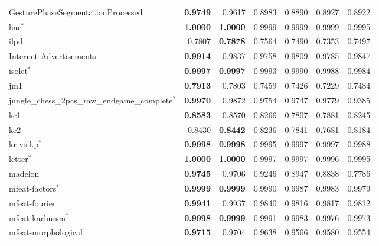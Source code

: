{\begin{longtable}{>{\raggedright\arraybackslash}p{3.3cm}rrrrrr}
Gesture\allowbreak Phase\allowbreak Segmentation\allowbreak Processed & \textbf{\num{0.9749}} & \num{0.9617} & \num{0.8983} & \num{0.8890} & \num{0.8927} & \num{0.8922} \\
har$^{*}$ & \textbf{\num{1.0000}} & \textbf{\num{1.0000}} & \num{0.9999} & \num{0.9999} & \num{0.9999} & \num{0.9995} \\
ilpd & \num{0.7807} & \textbf{\num{0.7878}} & \num{0.7564} & \num{0.7490} & \num{0.7353} & \num{0.7497} \\
Internet-Advertisements & \textbf{\num{0.9914}} & \num{0.9837} & \num{0.9758} & \num{0.9809} & \num{0.9785} & \num{0.9847} \\
isolet$^{*}$ & \textbf{\num{0.9997}} & \textbf{\num{0.9997}} & \num{0.9993} & \num{0.9990} & \num{0.9988} & \num{0.9984} \\
jm1 & \textbf{\num{0.7913}} & \num{0.7803} & \num{0.7459} & \num{0.7426} & \num{0.7229} & \num{0.7484} \\
jungle\_\allowbreak chess\_\allowbreak 2pcs\_\allowbreak raw\_\allowbreak endgame\_\allowbreak complete$^{*}$ & \textbf{\num{0.9970}} & \num{0.9872} & \num{0.9754} & \num{0.9747} & \num{0.9779} & \num{0.9385} \\
kc1 & \textbf{\num{0.8583}} & \num{0.8570} & \num{0.8266} & \num{0.7807} & \num{0.7881} & \num{0.8245} \\
kc2 & \num{0.8430} & \textbf{\num{0.8442}} & \num{0.8236} & \num{0.7841} & \num{0.7681} & \num{0.8184} \\
kr-vs-kp$^{*}$ & \textbf{\num{0.9998}} & \textbf{\num{0.9998}} & \num{0.9995} & \num{0.9997} & \num{0.9997} & \num{0.9988} \\
letter$^{*}$ & \textbf{\num{1.0000}} & \textbf{\num{1.0000}} & \num{0.9997} & \num{0.9997} & \num{0.9996} & \num{0.9995} \\
madelon & \textbf{\num{0.9745}} & \num{0.9706} & \num{0.9246} & \num{0.8947} & \num{0.8838} & \num{0.7786} \\
mfeat-factors$^{*}$ & \textbf{\num{0.9999}} & \textbf{\num{0.9999}} & \num{0.9990} & \num{0.9987} & \num{0.9983} & \num{0.9979} \\
mfeat-fourier & \textbf{\num{0.9941}} & \num{0.9937} & \num{0.9840} & \num{0.9816} & \num{0.9817} & \num{0.9812} \\
mfeat-karhunen$^{*}$ & \textbf{\num{0.9998}} & \textbf{\num{0.9999}} & \num{0.9991} & \num{0.9983} & \num{0.9976} & \num{0.9973} \\
mfeat-morphological & \textbf{\num{0.9715}} & \num{0.9704} & \num{0.9638} & \num{0.9566} & \num{0.9580} & \num{0.9554} \\

\end{longtable}}
